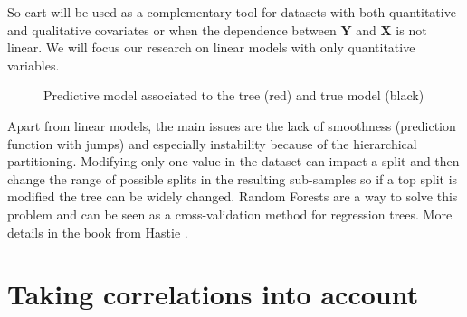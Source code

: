 \documentclass[12pt,a4paper]{report}
\begin{document}
		So {\sc cart} will be used as a complementary tool for datasets with both quantitative and qualitative covariates or when the dependence between $\boldsymbol{Y}$ and $\boldsymbol{X}$ is not linear. We will focus our research on linear models with only quantitative variables.
	\\
	
\begin{figure}[h!]
	 \quad
	\caption{Predictive model associated to the tree (red) and true model (black)}\label{arbretrivial}
\end{figure}

 Apart from linear models, the main issues are the lack of smoothness (prediction function with jumps) and especially instability because of the hierarchical partitioning. Modifying only one value in the dataset can impact a split and then change the range of possible splits in the resulting sub-samples so if a top split is modified the tree can be widely changed. Random Forests are a way to solve this problem and can be seen as a cross-validation method for regression trees. More details in the book from Hastie \cite{hastie2009elements}.	
	
	
		\FloatBarrier
			
	\section{Taking correlations into account}		%
\end{document}
